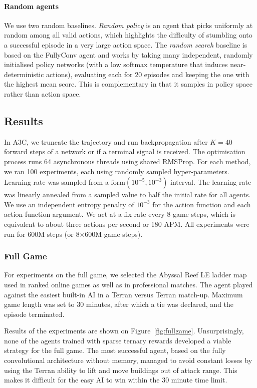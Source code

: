 \paragraph{Random agents} We use two random baselines. 
\emph{Random policy} is an agent that picks uniformly at random among all valid actions, which highlights the difficulty of stumbling onto a successful episode in a very large action space. The \emph{random search} baseline is based on the FullyConv agent and works by taking many independent, randomly initialised policy networks (with a low softmax temperature that induces near-deterministic actions), evaluating each for 20 episodes and keeping the one with the highest mean score. This is complementary in that it samples in policy space rather than action space.

\subsection{Results}

In A3C, we truncate the trajectory and run backpropagation after $K=40$ forward steps of a network or if a terminal signal is received. The optimisation process runs 64 asynchronous threads using shared RMSProp. For each method, we ran 100 experiments, each using randomly sampled hyper-parameters. Learning rate was sampled from a $\textrm{form}(10^{-5},10^{-3})$ interval. The learning rate was linearly annealed from a sampled value to half the initial rate for all agents. We use an independent entropy penalty of $10^{-3}$ for the action function and each action-function argument. We act at a fix rate every 8 game steps, which is equivalent to about three actions per second or 180 APM. All experiments were run for 600M steps (or 8$\times$600M game steps). 

\subsubsection{Full Game}

For experiments on the full game, we selected the Abyssal Reef LE ladder map used in ranked online games as well as in professional matches. The agent played against the easiest built-in AI in a Terran versus Terran match-up. Maximum game length was set to 30 minutes, after which a tie was declared, and the episode terminated.  

Results of the experiments are shown on Figure~\ref{fig:fullgame}. 
Unsurprisingly, none of the agents trained with sparse ternary rewards developed a viable strategy for the full game. The most successful agent, based on the fully convolutional architecture without memory, managed to avoid constant losses by using the Terran ability to lift and move buildings out of attack range.  This makes it difficult for the easy AI to win within the 30 minute time limit.

